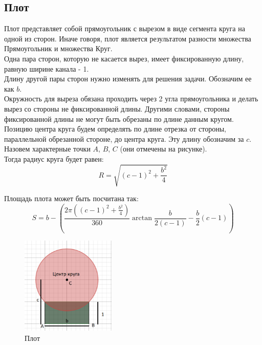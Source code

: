 \subsection{Плот}
Плот представляет собой прямоугольник с вырезом в виде сегмента круга на одной из сторон. Иначе говоря, плот является результатом разности множества Прямоугольник и множества Круг. \\

Одна пара сторон, которую не касается вырез, имеет фиксированную длину, равную ширине канала - 1. \\

Длину другой пары сторон нужно изменять для решения задачи. Обозначим ее как $b$. \\ 

Окружность для выреза обязана проходить через 2 угла прямоугольника и делать вырез со стороны не фиксированной длины. Другими словами, стороны фиксированной длины не могут быть обрезаны по длине данным кругом. Позицию центра круга будем определять по длине отрезка от стороны, параллельной обрезанной стороне, до центра круга. Эту длину обозначим за $c$. \\

Назовем характерные точки $A$, $B$, $C$ (они отмечены на рисунке).\\

Тогда радиус круга будет равен:
\begin{equation}
R=\sqrt{(c-1)^2+\frac{b^2}{4}}
\end{equation}

Площадь плота может быть посчитана так:
\begin{equation}
S=b-(\frac{2\pi ((c-1)^2+\frac{b^2}{4})}{360} \arctan{\frac{b}{2(c-1)}} - \frac{b}{2}(c-1))
\end{equation}

\begin{figure}[!htb]
    \centering
    \includegraphics[width=0.4\textwidth]{fig/sofa.png}
    \caption{Плот}
\end{figure}


